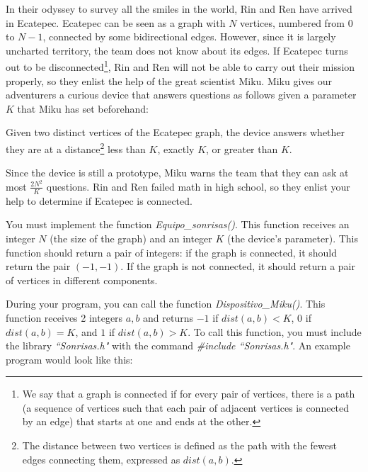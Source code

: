 \documentclass[12pt]{scrartcl}
\begin{document}

    \vspace{10pt}


        In their odyssey to survey all the smiles in the world, Rin and Ren have arrived in Ecatepec. Ecatepec can be seen as a graph with $N$ vertices, numbered from $0$ to $N - 1$, connected by some bidirectional edges. However, since it is largely uncharted territory, the team does not know about its edges. If Ecatepec turns out to be disconnected\footnote{We say that a graph is connected if for every pair of vertices, there is a path (a sequence of vertices such that each pair of adjacent vertices is connected by an edge) that starts at one and ends at the other.}, Rin and Ren will not be able to carry out their mission properly, so they enlist the help of the great scientist Miku. Miku gives our adventurers a curious device that answers questions as follows given a parameter $K$ that Miku has set beforehand:

        Given two distinct vertices of the Ecatepec graph, the device answers whether they are at a distance\footnote{The distance between two vertices is defined as the path with the fewest edges connecting them, expressed as $dist(a, b)$.} less than $K$, exactly $K$, or greater than $K$.

        Since the device is still a prototype, Miku warns the team that they can ask at most $\frac{2N^2}{K}$ questions. Rin and Ren failed math in high school, so they enlist your help to determine if Ecatepec is connected.
        


        You must implement the function \textit{Equipo\_sonrisas()}. This function receives an integer $N$ (the size of the graph) and an integer $K$ (the device's parameter). This function should return a pair of integers: if the graph is connected, it should return the pair $(-1, -1)$. If the graph is not connected, it should return a pair of vertices in different components. 
        
        During your program, you can call the function \textit{Dispositivo\_Miku()}. This function receives 2 integers $a, b$ and returns $-1$ if $dist(a, b) < K$, $0$ if $dist(a, b) = K$, and $1$ if $dist(a, b) > K$.
        To call this function, you must include the library \textit{``Sonrisas.h"} with the command \textit{\#include ``Sonrisas.h"}.
        An example program would look like this:
\end{document}
